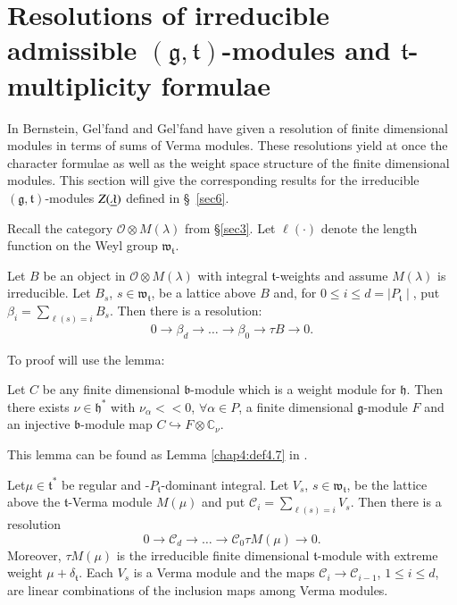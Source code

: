 
\chapter[Resolutions of irreducible admissible...]{Resolutions of
  irreducible admissible $(\mathfrak{g},  
  \mathfrak{t})$-modules and $\mathfrak{t}$-multiplicity
  formulae}\label{sec7} 

In\pageoriginale \cite{key1} Bernstein, Gel'fand and Gel'fand have
given a resolution of finite dimensional modules in terms of sums of
Verma modules. These resolutions yield at once the character formulae
as well as the weight space structure of the finite dimensional
modules. This section will give the corresponding results for the
irreducible $(\mathfrak{g}, \mathfrak{t})$-modules $Z(\underline{\lambda})$
defined in \S\ \ref{sec6}.

Recall the category $\mathscr{O} \otimes M(\lambda)$ from \S \ref{sec3}. Let
$\ell(\cdot)$ denote the length function on the Weyl group
$\mathfrak{w}_\mathfrak{t}$. 

\begin{prop}\label{chap7:prop7.1}
Let $B$ be an object in $\mathscr{O} \otimes M(\lambda)$ with integral
$\mathfrak{t}$-weights and assume $M(\lambda)$  is irreducible. Let
$B_s$, $s \in \mathfrak{w}_\mathfrak{t}$, be a lattice above $B$ and,
for $0 \leq i \leq d = \mid P_\mathfrak{t}\mid$, put $\beta_i =
\sum\limits_{\ell(s) = i} B_s$. Then there is a resolution:
$$
0 \to \beta_d \to \ldots \to \beta_0 \to \tau B \to 0.
$$
\end{prop}

To proof will use the lemma:

\begin{lemma}\label{chap7:lem7.2}
Let $C$ be any finite dimensional $\mathfrak{b}$-module which is a
weight module for $\mathfrak{h}$. Then there exists $\nu \in
\mathfrak{h}^*$ with $\nu_\alpha << 0$, $\forall \alpha \in P$, a
finite dimensional $\mathfrak{g}$-module $F$ and an injective
$\mathfrak{b}$-module map $C \hookrightarrow F \otimes
\mathbb{C}_\nu$. 
\end{lemma}

This lemma can be found as Lemma \ref{chap4:def4.7} in \cite{key15}. 

\begin{theorem}\label{chap7:thm7.3}
Let\pageoriginale $\mu \in \mathfrak{t}^*$ be regular and
-$P_\mathfrak{t}$-dominant integral. Let $V_s$, $s \in
\mathfrak{w}_\mathfrak{t}$, be the lattice above the
$\mathfrak{t}$-Verma module $M(\mu)$ and put $\mathcal{C}_i =
\sum\limits_{\ell(s) = i} V_s$. Then there is a resolution
$$
0 \to \mathcal{C}_d \to \ldots \to \mathcal{C}_0 \tau M(\mu) \to 0. 
$$
Moreover, $\tau M(\mu)$ is the irreducible finite dimensional
$\mathfrak{t}$-module with extreme weight $\mu +
\delta_\mathfrak{t}$. Each $V_s$ is a Verma module and the maps
$\mathcal{C}_i \to \mathcal{C}_{i-1}$, $1 \leq i \leq d$, are linear
combinations of the inclusion maps among Verma modules. 
\end{theorem}

